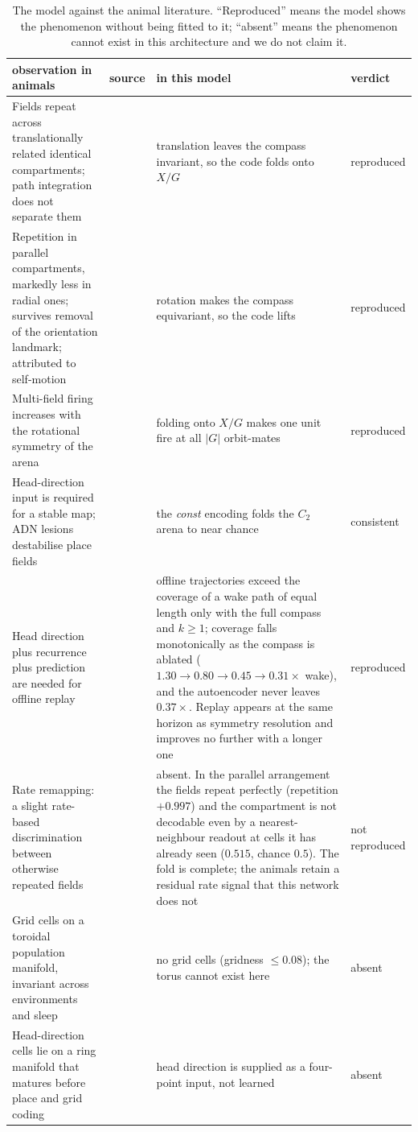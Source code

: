 \documentclass[9pt,lineno]{elife}
\begin{document}
\begin{table}[t]
\centering
\small
\setlength{\tabcolsep}{4pt}
\caption{The model against the animal literature. ``Reproduced'' means the model shows the
phenomenon without being fitted to it; ``absent'' means the phenomenon cannot exist in this
architecture and we do not claim it.}
\label{tab:bio}
\begin{tabular}{p{}p{}p{}p{}}
\toprule
observation in animals & source & in this model & verdict \\
\midrule
Fields repeat across translationally related identical compartments; path integration does not
separate them
& \citet{spiers2015} & translation leaves the compass invariant, so the code folds onto $X/G$
& reproduced \\[4pt]
Repetition in parallel compartments, markedly less in radial ones; survives removal of the
orientation landmark; attributed to self-motion
& \citet{grieves2016} & rotation makes the compass equivariant, so the code lifts
& reproduced \\[4pt]
Multi-field firing increases with the rotational symmetry of the arena
& \citet{muller1987, knierim1995} & folding onto $X/G$ makes one unit fire at all $|G|$ orbit-mates
& reproduced \\[4pt]
Head-direction input is required for a stable map; ADN lesions destabilise place fields
& \citet{calton2003} & the \textit{const} encoding folds the $C_2$ arena to near chance
& consistent \\[4pt]
Head direction plus recurrence plus prediction are needed for offline replay
& \citet{levenstein2024} & offline trajectories exceed the coverage of a wake path of equal
length only with the full compass and $k \ge 1$; coverage falls monotonically as the compass
is ablated ($1.30 \to 0.80 \to 0.45 \to 0.31 \times$ wake), and the autoencoder never leaves
$0.37\times$. Replay appears at the same horizon as symmetry resolution and improves no
further with a longer one
& reproduced \\[4pt]
Rate remapping: a slight rate-based discrimination between otherwise repeated fields
& \citet{spiers2015} & absent. In the parallel arrangement the fields repeat perfectly
(repetition $+0.997$) and the compartment is not decodable even by a nearest-neighbour
readout at cells it has already seen ($0.515$, chance $0.5$). The fold is complete; the
animals retain a residual rate signal that this network does not
& not reproduced \\[4pt]
Grid cells on a toroidal population manifold, invariant across environments and sleep
& \citet{gardner2022toroidal} & no grid cells (gridness $\le 0.08$); the torus cannot exist here
& absent \\[4pt]
Head-direction cells lie on a ring manifold that matures before place and grid coding
& \citet{taube1990, langston2010} & head direction is supplied as a four-point input, not learned
& absent \\
\bottomrule
\end{tabular}
\end{table}
\end{document}
